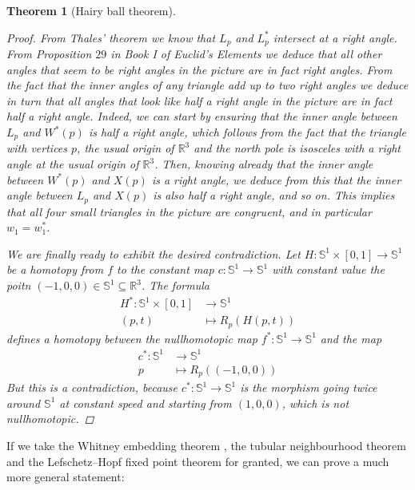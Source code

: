 \documentclass[A4paper, 12pt, british, reqno]{amsart}
\newcommand{\R}{\mathbb{R}} %
\newcommand{\bbS}{\mathbb{S}}
\theoremstyle{plain}
\newtheorem{thm}{Theorem}[section]
\theoremstyle{definition}
\theoremstyle{remark}
\theoremstyle{plain}
\theoremstyle{definition}
\theoremstyle{remark}
\theoremstyle{plain}
\theoremstyle{definition}
\theoremstyle{remark}
\begin{document}
\begin{thm}[Hairy ball theorem]
\begin{proof}
	From Thales' theorem we know that $L_{p}$ and $L^{*}_{p}$ intersect at a right angle.
	From Proposition $29$ in Book I of Euclid's \textit{Elements} we deduce that all other angles that seem to be right angles in the picture are in fact right angles.
	From the fact that the inner angles of any triangle add up to two right angles we deduce in turn that all angles that look like half a right angle in the picture are in fact half a right angle.
	Indeed, we can start by ensuring that the inner angle between $L_{p}$ and $W^{*}(p)$ is half a right angle, which follows from the fact that the triangle with vertices $p$, the usual origin of $\R^{3}$ and the north pole is isosceles with a right angle at the usual origin of $\R^{3}$.
	Then, knowing already that the inner angle between $W^{*}(p)$ and $X(p)$ is a right angle, we deduce from this that the inner angle between $L_{p}$ and $X(p)$ is also half a right angle, and so on.
	This implies that all four small triangles in the picture are congruent, and in particular $w_{1}=w_{1}^{*}$.

	We are finally ready to exhibit the desired contradiction.
	Let $H\colon \bbS^{1}\times [0,1]\to \bbS^{1}$ be a homotopy from $f$ to the constant map $c\colon \bbS^{1}\to \bbS^{1}$ with constant value the poitn $(-1,0,0)\in \bbS^{1}\subseteq \R^{3}$.
	The formula
	\begin{align*}
	    H^{*}\colon \bbS^{1}\times [0,1] & \longrightarrow \bbS^{1} \\
	    (p,t) & \longmapsto R_{p}(H(p,t))
	\end{align*}
	defines a homotopy between the nullhomotopic map $f^{*}\colon \bbS^{1}\to \bbS^{1}$ and the map
	\begin{align*}
	    c^{*}\colon \bbS^{1} & \longrightarrow \bbS^{1} \\
	    p  & \longmapsto R_{p}((-1,0,0))
	\end{align*}
	But this is a contradiction, because $c^{*}\colon \bbS^{1}\to \bbS^{1}$ is the morphism going twice around $\bbS^{1}$ at constant speed and starting from $(1,0,0)$, which is not nullhomotopic.
    \end{proof}
\end{thm}

If we take the Whitney embedding theorem \cite[Theorem II.10.7]{bre93}, the tubular neighbourhood theorem \cite[Theorem II.11.4]{bre93} and the Lefschetz--Hopf fixed point theorem \cite[Theorem IV.23.4]{bre93} for granted, we can prove a much more general statement:
\end{document}
